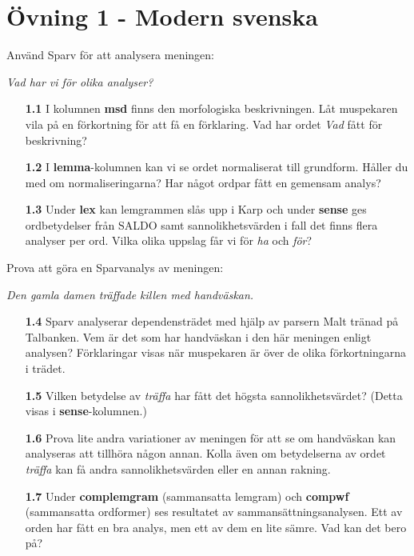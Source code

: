 \documentclass[paper=a4, fontsize=12pt]{scrartcl} %
\numberwithin{equation}{section} %
\numberwithin{figure}{section} %
\numberwithin{table}{section} %
\begin{document}
\section*{Övning 1 - Modern svenska}

Använd Sparv för att analysera meningen:

\newcommand{\example}[1]{\indent\qquad\quad\emph{#1}}

\example{Vad har vi för olika analyser?}

\begin{itemize}
    \item [\textbf{1.1}]
        I kolumnen \textbf{msd} finns den morfologiska beskrivningen.
        Låt muspekaren vila på en förkortning för att få en förklaring.
        Vad har ordet \emph{Vad} fått för beskrivning?

    \item [\textbf{1.2}]
        I \textbf{lemma}-kolumnen kan vi se ordet normaliserat
        till grundform. Håller du med om normaliseringarna?
        Har något ordpar fått en gemensam analys?

    \item [\textbf{1.3}]
        Under \textbf{lex} kan lemgrammen slås upp i Karp och
        under \textbf{sense} ges ordbetydelser från SALDO samt
        sannolikhetsvärden i fall det finns flera analyser per ord.
        Vilka olika uppslag får vi för \emph{ha} och \emph{för}?
\end{itemize}

\noindent
Prova att göra en Sparvanalys av meningen:

\example{Den gamla damen träffade killen med handväskan.}

\begin{itemize}
    \item [\textbf{1.4}]
        Sparv analyserar dependensträdet med hjälp av parsern Malt tränad på Talbanken.
        Vem är det som har handväskan i den här meningen enligt analysen?
        Förklaringar visas när muspekaren är över de olika förkortningarna i trädet.
    
    \item [\textbf{1.5}]
    	Vilken betydelse av \emph{träffa} har fått det högsta sannolikhetsvärdet?
    	(Detta visas i \textbf{sense}-kolumnen.)

    \item [\textbf{1.6}]
        Prova lite andra variationer av meningen för att se om
        handväskan kan analyseras att tillhöra någon annan. 
        Kolla även om betydelserna av ordet \emph{träffa} kan få andra 
        sannolikhetsvärden eller en annan rakning.

    \item [\textbf{1.7}]
        Under \textbf{complemgram} (sammansatta lemgram) och \textbf{compwf}
        (sammansatta ordformer) ses resultatet
        av sammansättningsanalysen. Ett av orden har fått en bra analys,
        men ett av dem en lite sämre. Vad kan det bero på?
\end{itemize}
\end{document}
